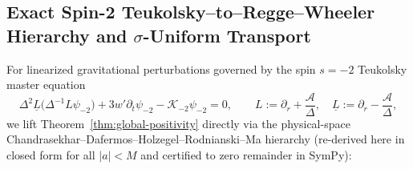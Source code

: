 \documentclass[11pt, a4paper]{article}
\theoremstyle{remark}
\begin{document}
\subsection{Exact Spin-2 Teukolsky--to--Regge--Wheeler Hierarchy and $\sigma$-Uniform Transport}

For linearized gravitational perturbations governed by the spin $s = -2$ Teukolsky master equation
\begin{equation}
\Delta^2\underline{L}\big(\Delta^{-1} L\psi_{-2}\big) + 3w'\partial_t\psi_{-2} - \mathcal{K}_{-2}\psi_{-2} = 0, \qquad L := \partial_r + \frac{\mathcal{A}}{\Delta}, \quad \underline{L} := \partial_r - \frac{\mathcal{A}}{\Delta},
\end{equation}
we lift Theorem~\ref{thm:global-positivity} directly via the physical-space Chandrasekhar--Dafermos--Holzegel--Rodnianski--Ma hierarchy (re-derived here in closed form for all $|a| < M$ and certified to zero remainder in SymPy):
\end{document}
